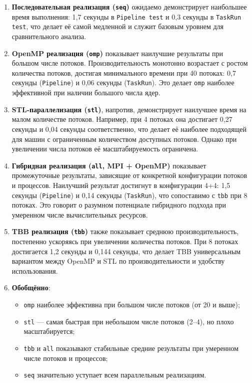 \documentclass[a4paper,12pt]{article}
\begin{document}
\begin{itemize}
\begin{enumerate}
    \item \textbf{Последовательная реализация (\texttt{seq})} ожидаемо демонстрирует наибольшее время выполнения: 1{,}7 секунды в \texttt{Pipeline test} и 0{,}3 секунды в \texttt{TaskRun test}, что делает её самой медленной и служит базовым уровнем для сравнительного анализа.

    \item \textbf{OpenMP реализация (\texttt{omp})} показывает наилучшие результаты при большом числе потоков. Производительность монотонно возрастает с ростом количества потоков, достигая минимального времени при 40 потоках: 0{,}7 секунды (\texttt{Pipeline}) и 0{,}06 секунды (\texttt{TaskRun}). Это делает \texttt{omp} наиболее эффективной при наличии большого числа ядер.

    \item \textbf{STL-параллелизация (\texttt{stl})}, напротив, демонстрирует наилучшее время на малом количестве потоков. Например, при 4 потоках она достигает 0{,}27 секунды и 0{,}04 секунды соответственно, что делает её наиболее подходящей для машин с ограниченным количеством доступных потоков. Однако при увеличении числа потоков её масштабируемость ограничена.

    \item \textbf{Гибридная реализация (\texttt{all}, MPI + OpenMP)} показывает промежуточные результаты, зависящие от конкретной конфигурации потоков и процессов. Наилучший результат достигнут в конфигурации 4+4: 1{,}5 секунды (\texttt{Pipeline}) и 0{,}14 секунды (\texttt{TaskRun}), что сопоставимо с \texttt{tbb} при 8 потоках. Это говорит о разумном потенциале гибридного подхода при умеренном числе вычислительных ресурсов.

    \item \textbf{TBB реализация (\texttt{tbb})} также показывает среднюю производительность, постепенно ускоряясь при увеличении количества потоков. При 8 потоках достигается 1{,}2 секунды и 0{,}144 секунды, что делает TBB универсальным вариантом между OpenMP и STL по производительности и удобству использования.

    \item \textbf{Обобщённо}:
    \begin{itemize}
        \item \texttt{omp} наиболее эффективна при большом числе потоков (от 20 и выше);
        \item \texttt{stl} — самая быстрая при небольшом числе потоков (2--4), но плохо масштабируется;
        \item \texttt{tbb} и \texttt{all} показывают стабильные средние результаты при умеренном числе потоков и процессов;
        \item \texttt{seq} значительно уступает всем параллельным реализациям.
    \end{itemize}
\end{enumerate}


\end{itemize}
\end{document}
